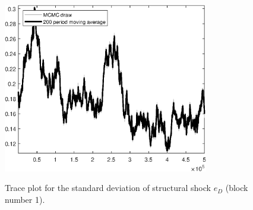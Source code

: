\begin{figure}[H]
\centering
  \includegraphics[width=0.8\textwidth]{BRS_growth_ext_shopping/graphs/TracePlot_SE_e_D_blck_1}\\
    \caption{Trace plot for the standard deviation of structural shock ${e_D}$ (block number 1).}
\end{figure}
